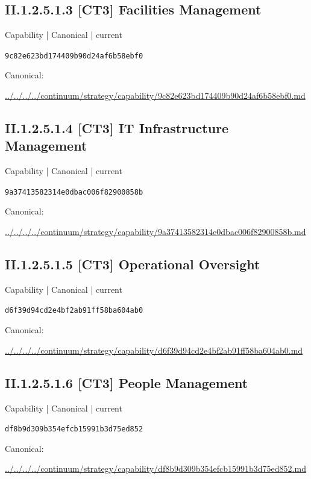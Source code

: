 \documentclass[10pt,a4paper]{article}
\begin{document}
\subsection*{II.1.2.5.1.3 [CT3] Facilities Management}
\label{element-9c82e623bd174409b90d24af6b58ebf0}
{\small Capability | Canonical | current}\par
\texttt{9c82e623bd174409b90d24af6b58ebf0}\par
Canonical: \par
{\footnotesize\url{../../../../continuum/strategy/capability/9c82e623bd174409b90d24af6b58ebf0.md}}\par
\subsection*{II.1.2.5.1.4 [CT3] IT Infrastructure Management}
\label{element-9a37413582314e0dbac006f82900858b}
{\small Capability | Canonical | current}\par
\texttt{9a37413582314e0dbac006f82900858b}\par
Canonical: \par
{\footnotesize\url{../../../../continuum/strategy/capability/9a37413582314e0dbac006f82900858b.md}}\par
\subsection*{II.1.2.5.1.5 [CT3] Operational Oversight}
\label{element-d6f39d94cd2e4bf2ab91ff58ba604ab0}
{\small Capability | Canonical | current}\par
\texttt{d6f39d94cd2e4bf2ab91ff58ba604ab0}\par
Canonical: \par
{\footnotesize\url{../../../../continuum/strategy/capability/d6f39d94cd2e4bf2ab91ff58ba604ab0.md}}\par
\subsection*{II.1.2.5.1.6 [CT3] People Management}
\label{element-df8b9d309b354efcb15991b3d75ed852}
{\small Capability | Canonical | current}\par
\texttt{df8b9d309b354efcb15991b3d75ed852}\par
Canonical: \par
{\footnotesize\url{../../../../continuum/strategy/capability/df8b9d309b354efcb15991b3d75ed852.md}}\par
\end{document}
